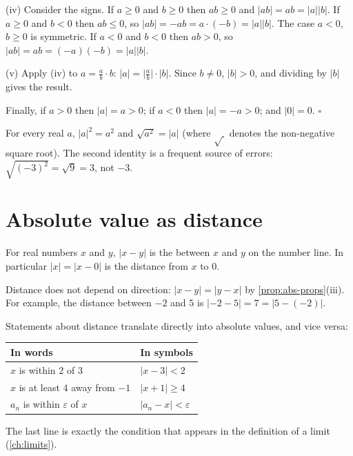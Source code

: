 (iv) Consider the signs. If $a\ge0$ and $b\ge0$ then $ab\ge0$ and $|ab|=ab=|a||b|$. If $a\ge0$ and $b<0$ then
$ab\le0$, so $|ab|=-ab=a\cdot(-b)=|a||b|$. The case $a<0$, $b\ge0$ is symmetric. If $a<0$ and $b<0$ then $ab>0$,
so $|ab|=ab=(-a)(-b)=|a||b|$.

(v) Apply (iv) to $a=\frac ab\cdot b$: $|a|=\big|\frac ab\big|\cdot|b|$. Since $b\ne0$, $|b|>0$, and dividing by
$|b|$ gives the result.

Finally, if $a>0$ then $|a|=a>0$; if $a<0$ then $|a|=-a>0$; and $|0|=0$. \hfill$\square$

\begin{external}
For every real $a$, $|a|^2=a^2$ and $\sqrt{a^2}=|a|$ (where $\sqrt{\ }$ denotes the non-negative square root).
The second identity is a frequent source of errors: $\sqrt{(-3)^2}=\sqrt9=3$, not $-3$.
\end{external}

\section{Absolute value as distance}\label{sec:abs-distance}

\begin{core}
For real numbers $x$ and $y$, $|x-y|$ is the  between $x$ and $y$ on the number line. In
particular $|x|=|x-0|$ is the distance from $x$ to $0$. 
\end{core}

Distance does not depend on direction: $|x-y|=|y-x|$ by \cref{prop:abs-props}(iii). For example, the distance
between $-2$ and $5$ is $|-2-5|=7=|5-(-2)|$.

Statements about distance translate directly into absolute values, and vice versa:
\begin{center}
\begin{tabular}{@{}ll@{}}
\toprule
In words & In symbols\\
\midrule
$x$ is within $2$ of $3$ & $|x-3|<2$\\
$x$ is at least $4$ away from $-1$ & $|x+1|\ge4$\\
$a_n$ is within $\varepsilon$ of $x$ & $|a_n-x|<\varepsilon$\\
\bottomrule
\end{tabular}
\end{center}
The last line is exactly the condition that appears in the definition of a limit (\cref{ch:limits}).

